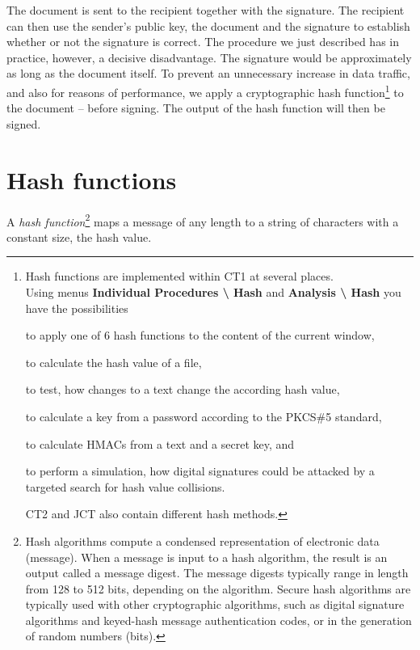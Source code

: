 The document is sent to the recipient together with the signature. The recipient
can then use the sender's public key, the document and the signature to
establish whether or not the signature is correct. The procedure we just described
has in practice, however, a decisive disadvantage. The signature would be
approximately as long as the document itself. To prevent an unnecessary increase
in data traffic, and also for reasons of performance, we apply
a cryptographic hash function\footnote{%
Hash functions are implemented within 
CT1 at several places.\\
Using menus {\bf Individual Procedures \textbackslash{} Hash} and
            {\bf Analysis \textbackslash{} Hash}
you have the possibilities
\begin{list}{\textbullet}{\addtolength{\itemsep}{-1.0\baselineskip}}
\item to apply one of 6 hash functions to the content of the current window, \\
\item to calculate the hash value of a file, \\
\item to test, how changes to a text change the according hash value,\\
\item to calculate a key from a password according to the PKCS\#5 
      standard, \\
\item to calculate HMACs from a text and a secret key, and\\
\item to perform a simulation, how digital signatures could be attacked 
      by a targeted search for hash value collisions.
\end{list}
CT2 and JCT also contain different hash
methods. }
to the document -- before signing. The output of the hash function will 
then be signed.



\hypertarget{Hash-functions-ht}{}
\section{Hash functions}
A {\em hash function}\footnote{%
Hash algorithms compute a condensed representation of electronic data
(message).
When a message is input to a hash algorithm, the result is an output called
a message digest. The message digests typically range in length 
from 128 to 512 bits, depending on the algorithm. 
Secure hash algorithms are typically used with
other cryptographic algorithms, such as digital signature algorithms and
keyed-hash message authentication codes, or in the generation of random
numbers (bits).
}
maps a message of any length to a string of characters with a constant size,
the  hash value. 



